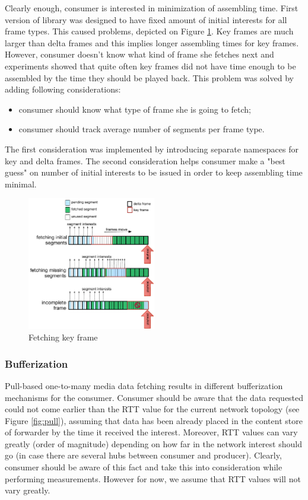 \documentclass[10pt]{proc}
\begin{document}
Clearly enough, consumer is interested in minimization of assembling time. First version of library was designed to have fixed amount of initial interests for all frame types. This caused problems, depicted on Figure \ref{fig:fetch-key}. Key frames are much larger than delta frames and this implies longer assembling times for key frames. However, consumer doesn't know what kind of frame she fetches next and experiments showed that quite often key frames did not have time enough to be assembled by the time they should be played back. This problem was solved by adding following considerations:
\begin{itemize}
\item consumer should know what type of frame she is going to fetch;
\item consumer should track average number of segments per frame type.
\end{itemize}

The first consideration was implemented by introducing separate namespaces for key and delta frames. The second consideration helps consumer make a "best guess" on number of initial interests to be issued in order to keep assembling time minimal.

\begin{figure}[Ht!]
\centering
\includegraphics[width=0.5\textwidth]{key-fetch}
\caption{Fetching key frame}
\label{fig:fetch-key}
\end{figure}


\subsubsection{Bufferization}

Pull-based one-to-many media data fetching results in different bufferization mechanisms for the consumer. Consumer should be aware that the data requested could not come earlier than the RTT value for the current network topology (see Figure \ref{fig:pull}), assuming that data has been already placed in the content store of forwarder by the time it received the interest. Moreover, RTT values can vary greatly (order of magnitude) depending on how far in the network interest should go (in case there are several hubs between consumer and producer). Clearly, consumer should be aware of this fact and take this into consideration while performing measurements. However for now, we assume that RTT values will not vary greatly.
\end{document}
